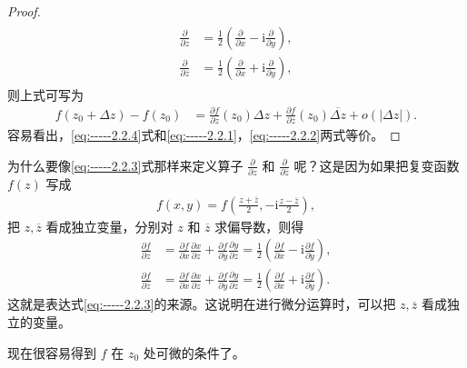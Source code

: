 \documentclass[../../main.tex]{subfiles}
\begin{document}
\begin{proof}
\begin{gather}
\begin{aligned}
\frac{\partial}{\partial z} &= \frac{1}{2}\left( \frac{\partial}{\partial x} - \text{i}\frac{\partial}{\partial y} \right), \\
\frac{\partial}{\partial \overline{z}} &= \frac{1}{2}\left( \frac{\partial}{\partial x} + \text{i}\frac{\partial}{\partial y} \right),
\end{aligned}
\end{gather}
则上式可写为
\begin{align}\label{eq:-----2.2.4}
f(z_0 + \Delta z) - f(z_0) &= \frac{\partial f}{\partial z}(z_0)\Delta z + \frac{\partial f}{\partial \overline{z}}(z_0)\overline{\Delta z} + o(|\Delta z|).
\end{align}
容易看出，\eqref{eq:-----2.2.4}式和\eqref{eq:-----2.2.1}，\eqref{eq:-----2.2.2}两式等价。

\end{proof}

\begin{remark}
为什么要像\eqref{eq:-----2.2.3}式那样来定义算子 \( \frac{\partial}{\partial z} \) 和 \( \frac{\partial}{\partial \overline{z}} \) 呢？这是因为如果把复变函数 \( f(z) \) 写成
\begin{align*}
f(x,y) = f\left( \frac{z + \overline{z}}{2}, -\text{i}\frac{z - \overline{z}}{2} \right),
\end{align*}
把 \( z,\overline{z} \) 看成独立变量，分别对 \( z \) 和 \( \overline{z} \) 求偏导数，则得
\begin{align*}
\frac{\partial f}{\partial z} &= \frac{\partial f}{\partial x}\frac{\partial x}{\partial z} + \frac{\partial f}{\partial y}\frac{\partial y}{\partial z} = \frac{1}{2}\left( \frac{\partial f}{\partial x} - \text{i}\frac{\partial f}{\partial y} \right), \\
\frac{\partial f}{\partial \overline{z}} &= \frac{\partial f}{\partial x}\frac{\partial x}{\partial \overline{z}} + \frac{\partial f}{\partial y}\frac{\partial y}{\partial \overline{z}} = \frac{1}{2}\left( \frac{\partial f}{\partial x} + \text{i}\frac{\partial f}{\partial y} \right).
\end{align*}
这就是表达式\eqref{eq:-----2.2.3}的来源。这说明在进行微分运算时，可以把 \( z,\overline{z} \) 看成独立的变量。

现在很容易得到 \( f \) 在 \( z_0 \) 处可微的条件了。
\end{remark}
\end{document}
